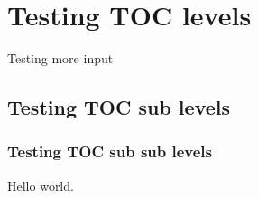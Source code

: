 \section{Testing TOC levels}
Testing more input

\subsection{Testing TOC sub levels}

\subsubsection{Testing TOC sub sub levels}
Hello world.
